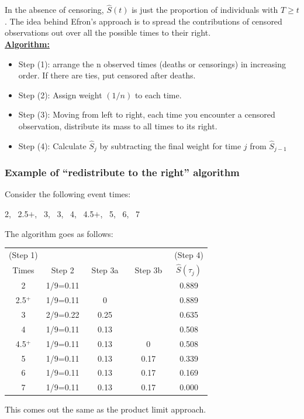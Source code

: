 \documentclass[11pt,slidesonly,semrot,portrait,palatino]{book}
\begin{document}
In the absence of censoring, $\hat{S}(t)$ is just the proportion of
individuals with $T\ge t$.  The idea behind Efron's approach
is to spread the contributions of censored observations out over all the
possible times to their right.
\\[2ex]
\underline{\bf Algorithm:}
\begin{itemize}
\item Step (1):  arrange the n observed times (deaths or censorings) in
increasing order.
If there are ties, put censored after deaths.
\item Step (2):  Assign weight $(1/n)$ to each time.
\item Step (3):  Moving from left to right, each time you encounter
a censored observation, distribute its mass to all times to its right.
\item Step (4): Calculate $\hat{S}_j$ by subtracting the final weight
 for time $j$ from $\hat{S}_{j-1}$
\end{itemize}
\subsubsection{Example of ``redistribute to the right'' algorithm}
Consider the following event times:
\begin{center}
2,~ 2.5$+$,~ 3,~ 3,~ 4,~ 4.5$+$,~ 5,~ 6,~ 7
\end{center}
The algorithm goes as follows:
\begin{center}
   \begin{tabular}{ccccc}\\
(Step 1) & & & & (Step 4)\\
       Times  & ~Step 2~ & ~Step 3a~ & ~Step 3b~ & $\hat{S}(\tau_j)$ \\\hline
       2 & 1/9=0.11  & & & 0.889\\
       2.5$^+$ & 1/9=0.11 & 0 & & 0.889\\
       3 & 2/9=0.22 & 0.25 & & 0.635\\
       4 & 1/9=0.11 & 0.13 & & 0.508\\
       4.5$^+$ & 1/9=0.11 & 0.13 & 0 & 0.508\\
       5 & 1/9=0.11 & 0.13 & 0.17 & 0.339\\
       6 & 1/9=0.11 & 0.13 & 0.17 & 0.169\\
       7 & 1/9=0.11 & 0.13 & 0.17 & 0.000\\ \hline
       \end{tabular}
\end{center}
This comes out the same as the product limit approach.
\end{document}
